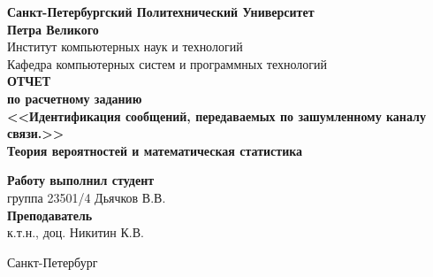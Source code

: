 \begin{titlepage}
\begin{center}
	\textbf{Санкт-Петербургский Политехнический Университет \\Петра Великого}\\[0.3cm]
	\small Институт компьютерных наук и технологий \\[0.3cm]
	\small Кафедра компьютерных систем и программных технологий\\[4cm]
	
	\textbf{ОТЧЕТ}\\ \textbf{по расчетному заданию}\\[0.5cm]
	\textbf{<<Идентификация сообщений, передаваемых по зашумленному каналу связи.>>}\\[0.1cm]
	\textbf{Теория вероятностей и математическая статистика}\\[8.0cm]
\end{center}

\begin{flushright}
	\begin{minipage}{0.48\textwidth}
		\begin{flushleft}
			\small \textbf{Работу выполнил студент}\\[3mm]
			\small группа 23501/4 \hspace*{6mm} Дьячков В.В.\\[5mm]
			
			\small \textbf{Преподаватель}\\[5mm]
		 	\small \sign[3cm] \hspace*{5mm} к.т.н., доц. Никитин К.В.\\[0.5cm]
		\end{flushleft}
	\end{minipage}
\end{flushright}

\vfill

\begin{center}
	\small Санкт-Петербург\\
	\small \the\year
\end{center}
\end{titlepage}

\addtocounter{page}{1}
